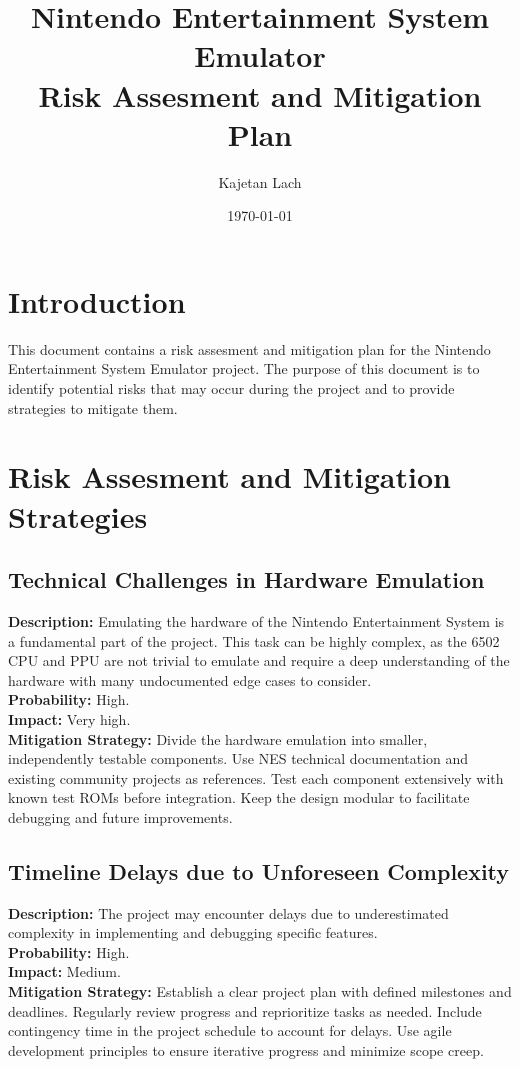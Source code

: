 \documentclass[a4paper, 11pt]{article}
\title{%
\textbf{Nintendo Entertainment System Emulator}\\
Risk Assesment and Mitigation Plan
}
\date{\today}
\author{Kajetan Lach}
\begin{document}
\maketitle

\section{Introduction}
This document contains a risk assesment and mitigation plan for the Nintendo Entertainment System Emulator project. The purpose of this document is to identify potential risks that may occur during the project and to provide strategies to mitigate them.

\section{Risk Assesment and Mitigation Strategies}

\subsection{Technical Challenges in Hardware Emulation}
\textbf{Description:} Emulating the hardware of the Nintendo Entertainment System is a fundamental part of the project. This task can be highly complex, as the 6502 CPU and PPU are not trivial to emulate and require a deep understanding of the hardware with many undocumented edge cases to consider.\\
\textbf{Probability:} High.\\
\textbf{Impact:} Very high.\\
\textbf{Mitigation Strategy:} Divide the hardware emulation into smaller, independently testable components. Use NES technical documentation and existing community projects as references. Test each component extensively with known test ROMs before integration. Keep the design modular to facilitate debugging and future improvements.\\

\newpage\subsection{Timeline Delays due to Unforeseen Complexity}
\textbf{Description:} The project may encounter delays due to underestimated complexity in implementing and debugging specific features.\\
\textbf{Probability:} High.\\
\textbf{Impact:} Medium.\\
\textbf{Mitigation Strategy:} Establish a clear project plan with defined milestones and deadlines. Regularly review progress and reprioritize tasks as needed. Include contingency time in the project schedule to account for delays. Use agile development principles to ensure iterative progress and minimize scope creep.\\
\end{document}
